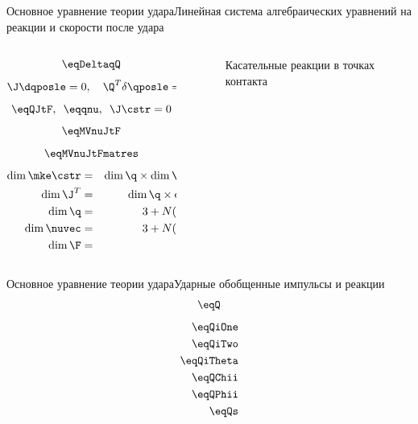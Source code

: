 \begin{frame}{Основное уравнение теории удара}{Линейная система алгебраических уравнений на реакции и скорости после удара}
    \begin{columns}
        \hspace{15pt}
        \begin{column}{0.35\textwidth}
            \vspace{-10pt}
            $$ \eqDeltaqQ $$
            $$ \J\dqposle = 0, \quad \Q^T\delta\qposle = 0 $$
            $$ \eqQJtF, \enspace \eqqnu, \enspace \J\cstr = 0 $$
            $$ \eqMVnuJtF $$
            $$ \eqMVnuJtFmatres $$
            \begin{eqnarray*}
                \dim \mke \cstr & = & \dim \q \times \dim \nuvec \\
                \dim \J^T & = & \dim \q \times \dim \F \\
                \dim \q & = & 3 + N(n + 1) \\
                \dim \nuvec & = & 3 + N(n - 1) \\
                \dim \F & = & 2N
            \end{eqnarray*}
        \end{column}
        \hspace{55pt}
        \begin{column}{0.65\textwidth}
            \begin{figure}
                \hspace{-55pt}
                \caption{Касательные реакции в точках контакта}
            \end{figure}
        \end{column}
    \end{columns}
\end{frame}

\begin{frame}{Основное уравнение теории удара}{Ударные обобщенные импульсы и реакции}
    \vspace{-5pt}
    $$ \eqQ $$
    \vspace{-15pt}
    \begin{eqnarray*}
    \eqQiOne \\
    \eqQiTwo \\
    \eqQiTheta \\
    \eqQChii \\
    \eqQPhii \\
    \eqQs
    \end{eqnarray*}
\end{frame}

